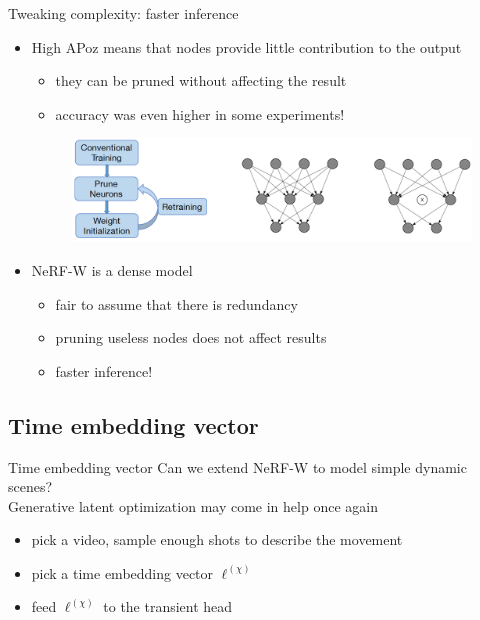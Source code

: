 \documentclass[aspectratio=1610]{beamer}
\begin{document}
\begin{frame}{Tweaking complexity: faster inference}
    \begin{itemize}
        \item High APoz means that nodes provide little contribution to the output
        \begin{itemize}
            \item they can be pruned without affecting the result
            \item accuracy was even higher in some experiments!
        \end{itemize}
        \bigskip
        \begin{figure}
            \includegraphics[width=.7\textwidth]{retrain.png}
        \end{figure}
        \bigskip
        \item NeRF-W is a dense model
        \begin{itemize}
            \item fair to assume that there is redundancy
            \item pruning useless nodes does not affect results
            \item faster inference!
        \end{itemize}
    \end{itemize}
\end{frame}

\subsection{Time embedding vector}
\begin{frame}{Time embedding vector}
    Can we extend NeRF-W to model simple dynamic scenes?\\
    \bigskip
    Generative latent optimization may come in help once again
    \begin{itemize}
        \item pick a video, sample enough shots to describe the movement
        \item pick a time embedding vector \(\ell^{(\chi)}\) 
        \item feed \(\ell^{(\chi)}\) to the transient head
    \end{itemize}
\end{frame}
\end{document}
